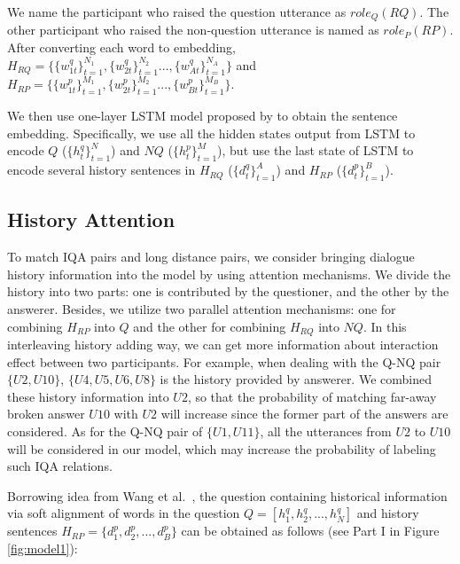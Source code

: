 We name the participant who raised the question utterance as $role_Q (RQ)$. The other participant who raised the non-question utterance is named as $role_P (RP)$. After converting each word to embedding, $H_{RQ}=\{ \{w_{1t}^{q}\}_{t=1}^{N_1}, \{w_{2t}^{q}\}_{t=1}^{N_2}... ,\{w_{At}^{q}\}_{t=1}^{N_A} \}$ and $H_{RP}=\{ \{w_{1t}^{p}\}_{t=1}^{M_1}, \{w_{2t}^{p}\}_{t=1}^{M_2}... ,\{w_{Bt}^{p}\}_{t=1}^{M_B} \}$.

 We then use one-layer LSTM model proposed by \cite{gers1999learning} to obtain the sentence embedding. Specifically, we use all the hidden states output from LSTM to encode $Q$ ($\{h_t^q\}_{t=1}^{N}$) and $NQ$ ($ \{h_t^p\}_{t=1}^{M}$), but use the last state of LSTM to encode several history sentences in $H_{RQ}$ ($\{d_t^q\}_{t=1}^{A}$) and $H_{RP}$ ($\{d_t^p\}_{t=1}^{B}$).



\subsection{History Attention}
To match IQA pairs and long distance pairs, we consider bringing dialogue history information into the model by using attention mechanisms. We divide the history into two parts: one is contributed by the questioner, and the other by the answerer. Besides, we utilize two parallel attention mechanisms: one for combining $H_{RP}$ into $Q$ and the other for combining $H_{RQ}$ into $NQ$. In this interleaving history adding way, we can get more information about interaction effect between two participants. For example, when dealing with the Q-NQ pair $\{U2,U10\}$, $\{U4,U5,U6,U8\}$ is the history provided by answerer. We combined these history information %
into $U2$, so that the probability of matching far-away broken answer $U10$ with $U2$ will increase since the former part of the answers are considered. As for the Q-NQ pair of $\{U1,U11\}$, all the utterances from $U2$ to $U10$ will be considered in our model, which may increase the probability of labeling such IQA relations.

Borrowing idea from Wang et al.~, the question containing historical information via soft alignment of words in the question $Q=[h^q_1,h^q_2,...,h^q_N]$ and history sentences $H_{RP}=\{d^p_1,d^p_2,...,d^p_B\}$ can be obtained as follows (see Part I in Figure \ref{fig:model1}):

